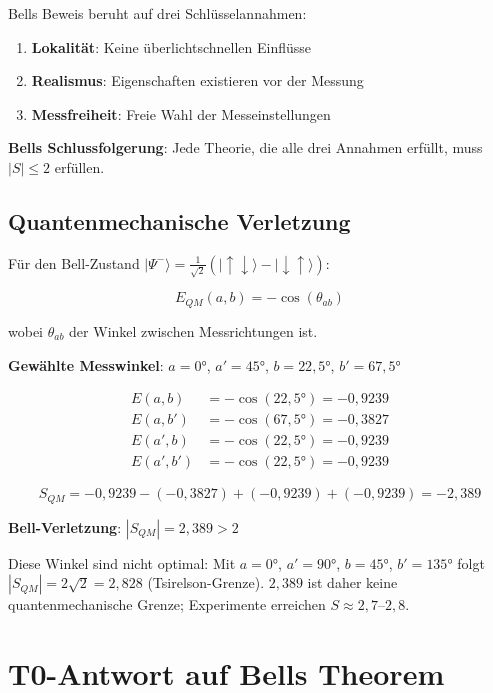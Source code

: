 	Bells Beweis beruht auf drei Schlüsselannahmen:
	
	\begin{enumerate}
		\item \textbf{Lokalität}: Keine überlichtschnellen Einflüsse
		\item \textbf{Realismus}: Eigenschaften existieren vor der Messung
		\item \textbf{Messfreiheit}: Freie Wahl der Messeinstellungen
	\end{enumerate}
	
	\textbf{Bells Schlussfolgerung}: Jede Theorie, die alle drei Annahmen erfüllt, muss $|S| \leq 2$ erfüllen.
	
	\subsection{Quantenmechanische Verletzung}
	
	Für den Bell-Zustand $|\Psi^-\rangle = \frac{1}{\sqrt{2}}(|\uparrow\downarrow\rangle - |\downarrow\uparrow\rangle)$:
	
	\begin{equation}
		E_{QM}(a,b) = -\cos(\theta_{ab})
	\end{equation}
	
	wobei $\theta_{ab}$ der Winkel zwischen Messrichtungen ist.
	
	\textbf{Gewählte Messwinkel}: $a = 0°$, $a' = 45°$, $b = 22,5°$, $b' = 67,5°$
	
	\begin{align}
		E(a,b) &= -\cos(22,5°) = -0,9239 \\
		E(a,b') &= -\cos(67,5°) = -0,3827 \\
		E(a',b) &= -\cos(22,5°) = -0,9239 \\
		E(a',b') &= -\cos(22,5°) = -0,9239
	\end{align}
	
	\begin{equation}
		S_{QM} = -0,9239 - (-0,3827) + (-0,9239) + (-0,9239) = -2,389
	\end{equation}
	
	\textbf{Bell-Verletzung}: $|S_{QM}| = 2,389 > 2$
	
	Diese Winkel sind nicht optimal: Mit $a = 0°$, $a' = 90°$, $b = 45°$, $b' = 135°$ folgt $|S_{QM}| = 2\sqrt2 = 2,828$ (Tsirelson-Grenze). $2,389$ ist daher keine quantenmechanische Grenze; Experimente erreichen $S \approx 2,7$--$2,8$.
	
	\section{T0-Antwort auf Bells Theorem}
	
